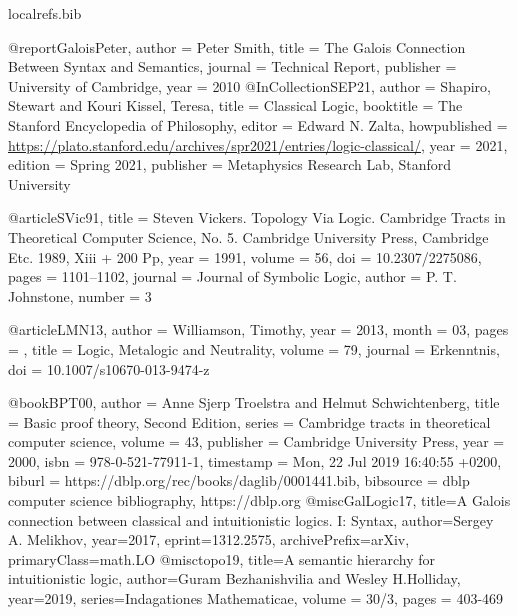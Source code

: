 \begin{filecontents}{localrefs.bib}

@report{GaloisPeter,
	author = {Peter Smith},
	title = {The Galois Connection Between Syntax and Semantics},
	journal = {Technical Report},
	publisher = {University of Cambridge},
	year = {2010}
}
@InCollection{SEP21,
	author       =	{Shapiro, Stewart and Kouri Kissel, Teresa},
	title        =	{{Classical Logic}},
	booktitle    =	{The {Stanford} Encyclopedia of Philosophy},
	editor       =	{Edward N. Zalta},
	howpublished =	{\url{https://plato.stanford.edu/archives/spr2021/entries/logic-classical/}},
	year         =	{2021},
	edition      =	{{S}pring 2021},
	publisher    =	{Metaphysics Research Lab, Stanford University}
}

@article{SVic91,
	title = {Steven Vickers. Topology Via Logic. Cambridge Tracts in Theoretical Computer Science, No. 5. Cambridge University Press, Cambridge Etc. 1989, Xiii + 200 Pp},
	year = {1991},
	volume = {56},
	doi = {10.2307/2275086},
	pages = {1101--1102},
	journal = {Journal of Symbolic Logic},
	author = {P. T. Johnstone},
	number = {3}
}

@article{LMN13,
author = {Williamson, Timothy},
year = {2013},
month = {03},
pages = {},
title = {Logic, Metalogic and Neutrality},
volume = {79},
journal = {Erkenntnis},
doi = {10.1007/s10670-013-9474-z}
}

@book{BPT00,
  author    = {Anne Sjerp Troelstra and
               Helmut Schwichtenberg},
  title     = {Basic proof theory, Second Edition},
  series    = {Cambridge tracts in theoretical computer science},
  volume    = {43},
  publisher = {Cambridge University Press},
  year      = {2000},
  isbn      = {978-0-521-77911-1},
  timestamp = {Mon, 22 Jul 2019 16:40:55 +0200},
  biburl    = {https://dblp.org/rec/books/daglib/0001441.bib},
  bibsource = {dblp computer science bibliography, https://dblp.org}
}
@misc{GalLogic17,
      title={A Galois connection between classical and intuitionistic logics. I: Syntax}, 
      author={Sergey A. Melikhov},
      year={2017},
      eprint={1312.2575},
      archivePrefix={arXiv},
      primaryClass={math.LO}
}
@misc{topo19,
      title={A semantic hierarchy for intuitionistic logic}, 
      author={Guram Bezhanishvilia and Wesley H.Holliday},
      year={2019},
      series={Indagationes Mathematicae},
      volume  = {30/3},
      pages  = {403-469}
}


\end{filecontents}
